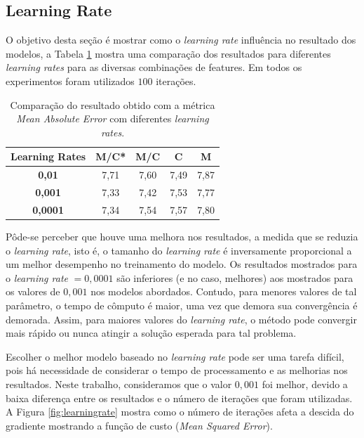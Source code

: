 \documentclass[conference]{IEEEtran}
\begin{document}
\subsection{Learning Rate}

O objetivo desta seção é mostrar como o \emph{learning rate} influência no resultado dos modelos, a Tabela \ref{tab:rates} mostra uma comparação dos resultados para diferentes \emph{learning rates} para as diversas combinações de features. Em todos os experimentos foram utilizados $100$ iterações.

\begin{table}[!h]
	\centering

	\begin{tabular}{ccccc} \\ \hline
		\textbf{Learning Rates} & \textbf{M/C*} & \textbf{M/C} & \textbf{C} & \textbf{M} \\ \hline
		\textbf{0,01}   & 7,71          & 7,60         & 7,49       & 7,87       \\
		\textbf{0,001}  & 7,33          & 7,42         & 7,53       & 7,77       \\
		\textbf{0,0001} & 7,34          & 7,54         & 7,57       & 7,80       \\ \hline
	\end{tabular}
	\caption{Comparação do resultado obtido com a métrica \textit{Mean Absolute Error} com diferentes \emph{learning rates}.}
	\label{tab:rates}
\end{table}

Pôde-se perceber que houve uma melhora nos resultados, a medida que se reduzia o \textit{learning rate}, isto é, o tamanho do \textit{learning rate} é inversamente proporcional a um melhor desempenho no treinamento do modelo. Os resultados mostrados para o \emph{learning rate} $= 0,0001$ são inferiores (e no caso, melhores) aos mostrados para os valores de $0,001$ nos modelos abordados. Contudo, para menores valores de tal parâmetro, o tempo de cômputo é maior, uma vez que demora sua convergência é demorada. Assim, para maiores valores do \textit{learning rate}, o método pode convergir mais rápido ou nunca atingir a solução esperada para tal problema.

Escolher o melhor modelo baseado no \textit{learning rate} pode ser uma tarefa difícil, pois há necessidade de considerar o tempo de processamento e as melhorias nos resultados. Neste trabalho, consideramos que o valor $0,001$ foi melhor, devido a baixa diferença entre os resultados e o número de iterações que foram utilizadas. A Figura \ref{fig:learningrate} mostra como o número de iterações afeta a descida do gradiente mostrando a função de custo (\emph{Mean Squared Error}).
\end{document}
